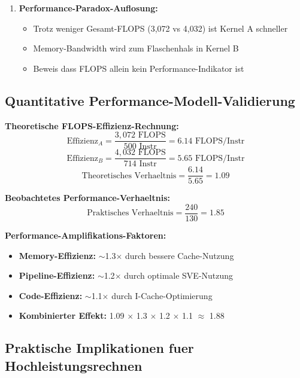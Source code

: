 \documentclass[11pt,a4paper]{article}
\begin{document}
\begin{enumerate}
\item \textbf{Performance-Paradox-Auflosung:}
   \begin{itemize}
   \item Trotz weniger Gesamt-FLOPS (3,072 vs 4,032) ist Kernel A schneller
   \item Memory-Bandwidth wird zum Flaschenhals in Kernel B
   \item Beweis dass FLOPS allein kein Performance-Indikator ist
   \end{itemize}
\end{enumerate}

\subsection{Quantitative Performance-Modell-Validierung}

\textbf{Theoretische FLOPS-Effizienz-Rechnung:}
$$\text{Effizienz}_A = \frac{3,072 \text{ FLOPS}}{500 \text{ Instr}} = 6.14 \text{ FLOPS/Instr}$$
$$\text{Effizienz}_B = \frac{4,032 \text{ FLOPS}}{714 \text{ Instr}} = 5.65 \text{ FLOPS/Instr}$$
$$\text{Theoretisches Verhaeltnis} = \frac{6.14}{5.65} = 1.09$$

\textbf{Beobachtetes Performance-Verhaeltnis:}
$$\text{Praktisches Verhaeltnis} = \frac{240}{130} = 1.85$$

\textbf{Performance-Amplifikations-Faktoren:}
\begin{itemize}
\item \textbf{Memory-Effizienz:} $\sim$1.3$\times$ durch bessere Cache-Nutzung
\item \textbf{Pipeline-Effizienz:} $\sim$1.2$\times$ durch optimale SVE-Nutzung  
\item \textbf{Code-Effizienz:} $\sim$1.1$\times$ durch I-Cache-Optimierung
\item \textbf{Kombinierter Effekt:} 1.09 $\times$ 1.3 $\times$ 1.2 $\times$ 1.1 $\approx$ 1.88
\end{itemize}

\subsection{Praktische Implikationen fuer Hochleistungsrechnen}
\end{document}
